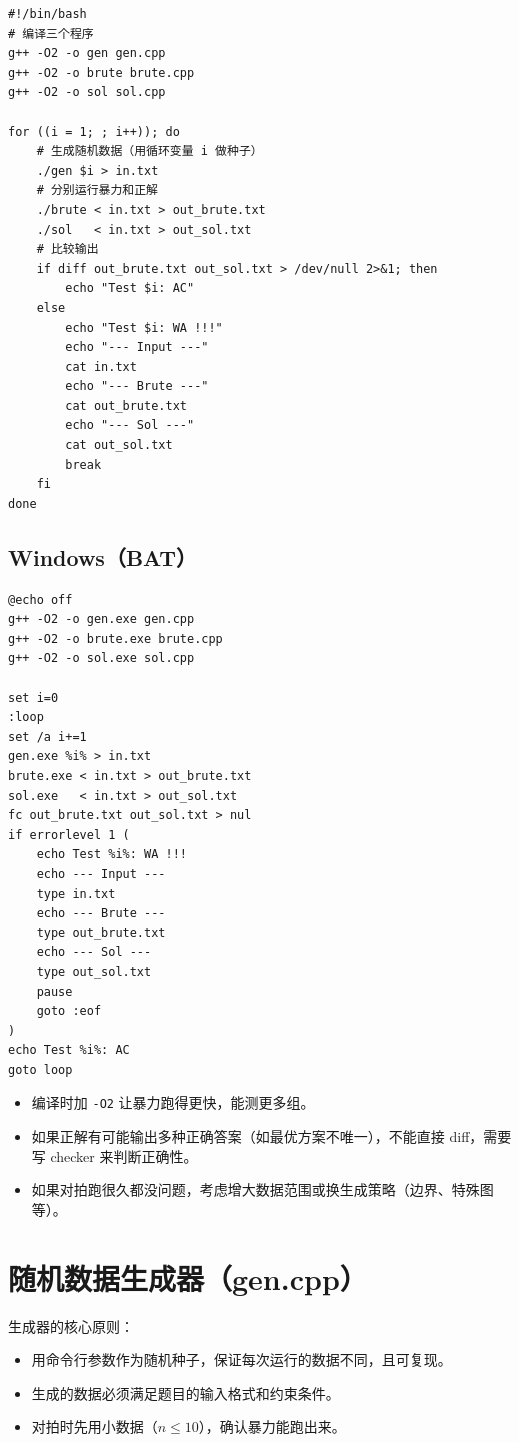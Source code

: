 \documentclass[UTF8,openany,oneside,zihao=-4]{ctexbook}
\begin{document}
\begin{lstlisting}
#!/bin/bash
# 编译三个程序
g++ -O2 -o gen gen.cpp
g++ -O2 -o brute brute.cpp
g++ -O2 -o sol sol.cpp

for ((i = 1; ; i++)); do
    # 生成随机数据（用循环变量 i 做种子）
    ./gen $i > in.txt
    # 分别运行暴力和正解
    ./brute < in.txt > out_brute.txt
    ./sol   < in.txt > out_sol.txt
    # 比较输出
    if diff out_brute.txt out_sol.txt > /dev/null 2>&1; then
        echo "Test $i: AC"
    else
        echo "Test $i: WA !!!"
        echo "--- Input ---"
        cat in.txt
        echo "--- Brute ---"
        cat out_brute.txt
        echo "--- Sol ---"
        cat out_sol.txt
        break
    fi
done
\end{lstlisting}

\subsection{Windows（BAT）}

\begin{lstlisting}
@echo off
g++ -O2 -o gen.exe gen.cpp
g++ -O2 -o brute.exe brute.cpp
g++ -O2 -o sol.exe sol.cpp

set i=0
:loop
set /a i+=1
gen.exe %i% > in.txt
brute.exe < in.txt > out_brute.txt
sol.exe   < in.txt > out_sol.txt
fc out_brute.txt out_sol.txt > nul
if errorlevel 1 (
    echo Test %i%: WA !!!
    echo --- Input ---
    type in.txt
    echo --- Brute ---
    type out_brute.txt
    echo --- Sol ---
    type out_sol.txt
    pause
    goto :eof
)
echo Test %i%: AC
goto loop
\end{lstlisting}

\begin{warn}
\begin{itemize}
  \item 编译时加 \lstinline|-O2| 让暴力跑得更快，能测更多组。
  \item 如果正解有可能输出多种正确答案（如最优方案不唯一），不能直接 diff，需要写 checker 来判断正确性。
  \item 如果对拍跑很久都没问题，考虑增大数据范围或换生成策略（边界、特殊图等）。
\end{itemize}
\end{warn}

\section{随机数据生成器（gen.cpp）}

\begin{note}
生成器的核心原则：
\begin{itemize}
  \item 用命令行参数作为随机种子，保证每次运行的数据不同，且可复现。
  \item 生成的数据必须满足题目的输入格式和约束条件。
  \item 对拍时先用小数据（$n \le 10$），确认暴力能跑出来。
\end{itemize}
\end{note}
\end{document}

